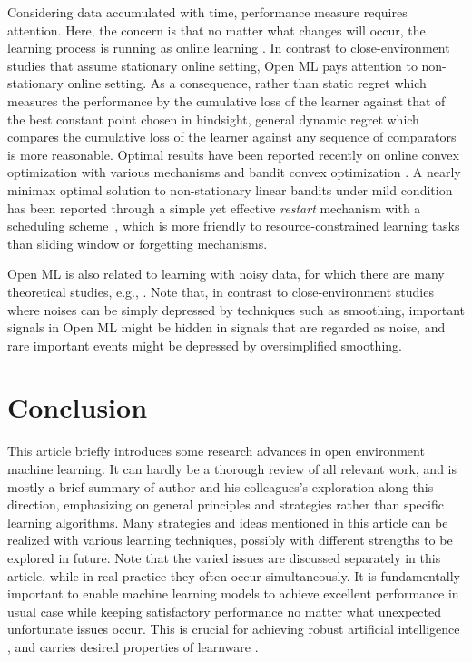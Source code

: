\documentclass[review,11pt]{ReportTemplate}
\begin{document}
Considering data accumulated with time, performance measure requires attention. Here, the concern is that no matter what changes will occur, the learning process is running as online learning \cite{CesaBianchi:Lugosi2006,ShalevShwartz2011}. In contrast to close-environment studies that assume stationary online setting, Open ML pays attention to non-stationary online setting. As a consequence, rather than static regret which measures the performance by the cumulative loss of the learner against that of the best constant point chosen in hindsight, general dynamic regret \cite{Zinkevich2003} which compares the cumulative loss of the learner against any sequence of comparators is more reasonable. Optimal results have been reported recently on online convex optimization with various mechanisms \cite{Zhang:Lu:Zhou2018,Zhao:Zhang:Zhang:Zhou2020,Zhao:Wang:Zhou2022} %
and bandit convex optimization \cite{Zhao:Wang:Zhang:Zhou2021}. A nearly minimax optimal solution to non-stationary linear bandits under mild condition has been reported through a simple yet effective \textit{restart} mechanism \cite{Zhao:Zhang:Jiang:Zhou2020} with a scheduling scheme~\cite{Wei:Luo2021}, which is more friendly to resource-constrained learning tasks than sliding window or forgetting mechanisms.

Open ML is also related to learning with noisy data, for which there are many theoretical studies, e.g., \cite{Angluin:Laird1988,Blum:Kalai:2003,Natarajan:Dhillon:Ravikumar:Tewari2013,Gao:Wang:Li:Zhou2016,Gao:Zhang:Yang:Zhou2021}.
Note that, in contrast to close-environment studies where noises can be simply depressed by techniques such as smoothing, important signals in Open ML might be hidden in signals that are regarded as noise, and rare important events might be depressed by oversimplified smoothing.


\section{Conclusion}

This article briefly introduces some research advances in open environment machine learning. It can hardly be a thorough review of all relevant work, and is mostly a brief summary of author and his colleagues's exploration along this direction, emphasizing on general principles and strategies rather than specific learning algorithms. Many strategies and ideas mentioned in this article can be realized with various learning techniques, possibly with different strengths to be explored in future. Note that the varied issues are discussed separately in this article, while in real practice they often occur simultaneously. It is fundamentally important to enable machine learning models to achieve excellent performance in usual case while keeping satisfactory performance no matter what unexpected unfortunate issues occur. This is crucial for achieving robust artificial intelligence \cite{Dietterich2017,Dietterich2019}, and carries desired properties of learnware \cite{Zhou2016}.
\end{document}
